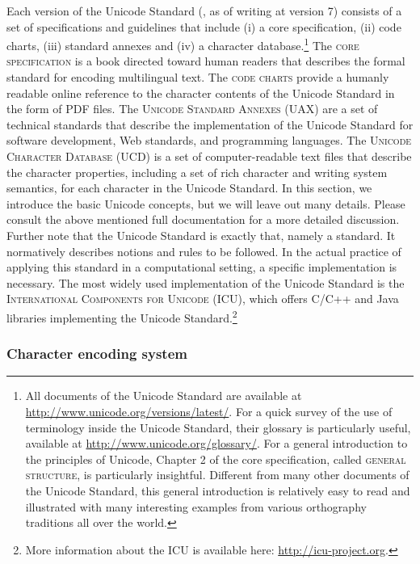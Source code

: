Each version of the Unicode Standard (\citealp{Unicode2014}, as of writing at
version 7) consists of a set of specifications and guidelines that include (i) a
core specification, (ii) code charts, (iii) standard annexes and (iv) a
character database.\footnote{All documents of the Unicode Standard are available
at \url{http://www.unicode.org/versions/latest/}. For a quick survey of the use
of terminology inside the Unicode Standard, their glossary is particularly
useful, available at \url{http://www.unicode.org/glossary/}. For a general
introduction to the principles of Unicode, Chapter 2 of the core specification,
called \textsc{general structure}, is particularly insightful. Different from
many other documents of the Unicode Standard, this general introduction is
relatively easy to read and illustrated with many interesting examples from
various orthography traditions all over the world.} The \textsc{core
specification} is a book directed toward human readers that describes the formal
standard for encoding multilingual text. The \textsc{code charts} provide a
humanly readable online reference to the character contents of the Unicode
Standard in the form of PDF files. The \textsc{Unicode Standard Annexes (UAX)}
are a set of technical standards that describe the implementation of the Unicode
Standard for software development, Web standards, and programming languages.
The \textsc{Unicode Character Database (UCD)} is a set of computer-readable text
files that describe the character properties, including a set of rich character
and writing system semantics, for each character in the Unicode Standard. In
this section, we introduce the basic Unicode concepts, but we will leave out
many details. Please consult the above mentioned full documentation for a more
detailed discussion. Further note that the Unicode Standard is exactly that,
namely a standard. It normatively describes notions and rules to be followed. In
the actual practice of applying this standard in a computational setting, a
specific implementation is necessary. The most widely used implementation of the
Unicode Standard is the \textsc{International Components for Unicode (ICU)},
which offers C/C++ and Java libraries implementing the Unicode
Standard.\footnote{More information about the ICU is available here:
\url{http://icu-project.org}.}

\subsubsection*{Character encoding system}

